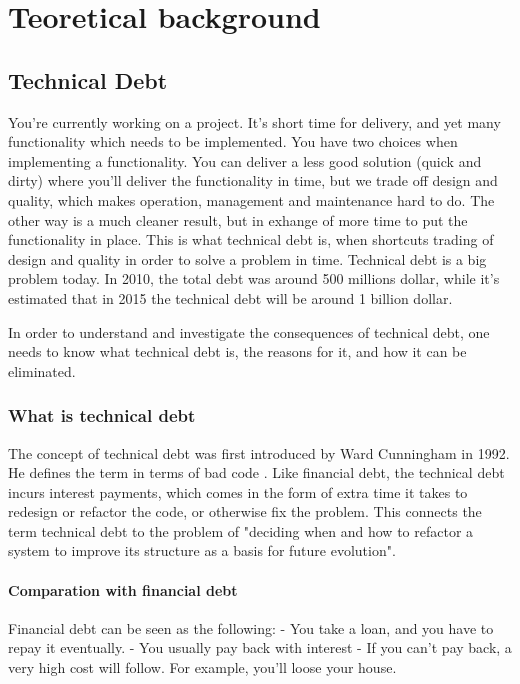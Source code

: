\part{Teoretical background}
\chapter{Technical Debt}


You're currently working on a project. It's short time for delivery, and yet many functionality which needs to be implemented. You have two choices when implementing a functionality. You can deliver a less good solution (quick and dirty) where you'll deliver the functionality in time, but we trade off design and quality, which makes operation, management and maintenance hard to do. The other way is a much cleaner result, but in exhange of more time to put the functionality in place. This is what technical debt is, when shortcuts trading of design and quality in order to solve a problem in time. Technical debt is a big problem today. In 2010, the total debt was around 500 millions dollar, while it's estimated that in 2015 the technical debt will be around 1 billion dollar.

In order to understand and investigate the consequences of technical debt, one needs to know what technical debt is, the reasons for it, and how it can be eliminated.


\section{What is technical debt}
The concept of technical debt was first introduced by Ward Cunningham in 1992\cite{cunningham}. He defines the term in terms of bad code . Like financial debt, the technical debt incurs interest payments, which comes in the form of extra time it takes to redesign or refactor the code, or otherwise fix the problem\cite{allmann}. This connects the term technical debt to the problem of "deciding when and how to refactor a system to improve its structure as a basis for future evolution". 

\subsection{Comparation with financial debt}
Financial debt can be seen as the following:
- You take a loan, and you have to repay it eventually.
- You usually pay back with interest
- If you can't pay back, a very high cost will follow. For example, you'll loose your house.

